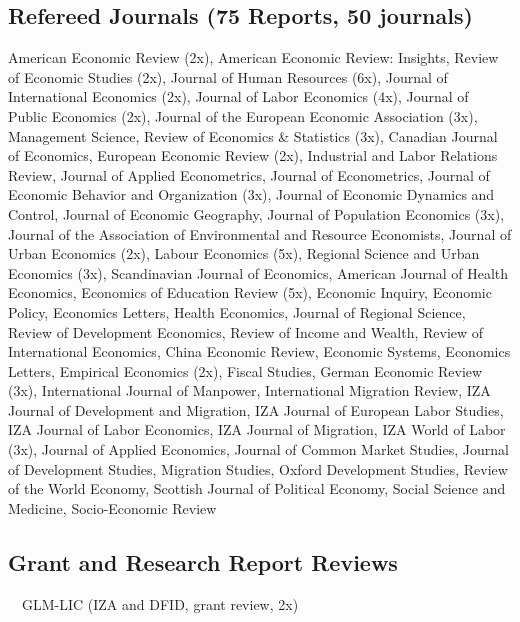 \documentclass[10pt,a4paper,]{article}
\begin{document}
\hypertarget{refereed-journals-75-reports-50-journals}{%
\subsection{Refereed Journals (75 Reports, 50
journals)}\label{refereed-journals-75-reports-50-journals}}

American Economic Review (2x), American Economic Review: Insights,
Review of Economic Studies (2x), Journal of Human Resources (6x),
Journal of International Economics (2x), Journal of Labor Economics
(4x), Journal of Public Economics (2x), Journal of the European Economic
Association (3x), Management Science, Review of Economics \& Statistics
(3x), Canadian Journal of Economics, European Economic Review (2x),
Industrial and Labor Relations Review, Journal of Applied Econometrics,
Journal of Econometrics, Journal of Economic Behavior and Organization
(3x), Journal of Economic Dynamics and Control, Journal of Economic
Geography, Journal of Population Economics (3x), Journal of the
Association of Environmental and Resource Economists, Journal of Urban
Economics (2x), Labour Economics (5x), Regional Science and Urban
Economics (3x), Scandinavian Journal of Economics, American Journal of
Health Economics, Economics of Education Review (5x), Economic Inquiry,
Economic Policy, Economics Letters, Health Economics, Journal of
Regional Science, Review of Development Economics, Review of Income and
Wealth, Review of International Economics, China Economic Review,
Economic Systems, Economics Letters, Empirical Economics (2x), Fiscal
Studies, German Economic Review (3x), International Journal of Manpower,
International Migration Review, IZA Journal of Development and
Migration, IZA Journal of European Labor Studies, IZA Journal of Labor
Economics, IZA Journal of Migration, IZA World of Labor (3x), Journal of
Applied Economics, Journal of Common Market Studies, Journal of
Development Studies, Migration Studies, Oxford Development Studies,
Review of the World Economy, Scottish Journal of Political Economy,
Social Science and Medicine, Socio-Economic Review

\hypertarget{grant-and-research-report-reviews}{%
\subsection{Grant and Research Report
Reviews}\label{grant-and-research-report-reviews}}

~~GLM-LIC (IZA and DFID, grant review, 2x)
\end{document}
